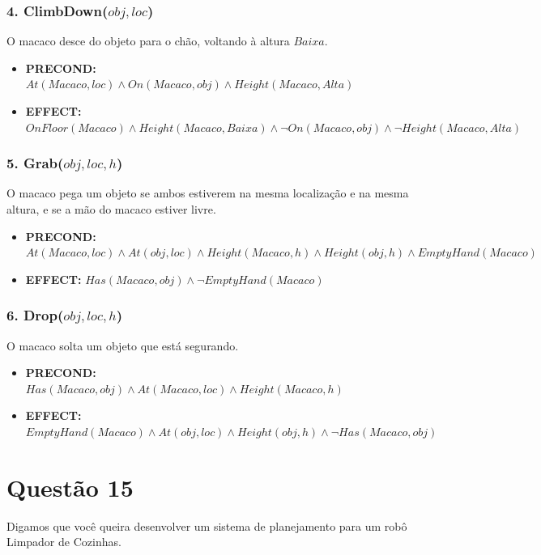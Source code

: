 \documentclass[a4paper,12pt]{article}
\begin{document}
\subsubsection*{4. ClimbDown($obj, loc$)}
O macaco desce do objeto para o chão, voltando à altura $Baixa$.
\begin{itemize}
	\item \textbf{PRECOND:} $At(Macaco, loc) \wedge On(Macaco, obj) \wedge Height(Macaco, Alta)$
	\item \textbf{EFFECT:} $OnFloor(Macaco) \wedge Height(Macaco, Baixa) \wedge \neg On(Macaco, obj) \wedge \neg Height(Macaco, Alta)$
\end{itemize}

\subsubsection*{5. Grab($obj, loc, h$)}
O macaco pega um objeto se ambos estiverem na mesma localização e na mesma altura, e se a mão do macaco estiver livre.
\begin{itemize}
	\item \textbf{PRECOND:} $At(Macaco, loc) \wedge At(obj, loc) \wedge Height(Macaco, h) \wedge Height(obj, h) \wedge EmptyHand(Macaco)$
	\item \textbf{EFFECT:} $Has(Macaco, obj) \wedge \neg EmptyHand(Macaco)$
\end{itemize}

\subsubsection*{6. Drop($obj, loc, h$)}
O macaco solta um objeto que está segurando.
\begin{itemize}
	\item \textbf{PRECOND:} $Has(Macaco, obj) \wedge At(Macaco, loc) \wedge Height(Macaco, h)$
	\item \textbf{EFFECT:} $EmptyHand(Macaco) \wedge At(obj, loc) \wedge Height(obj, h) \wedge \neg Has(Macaco, obj)$
\end{itemize}


\section*{Questão 15}


Digamos que você queira desenvolver um sistema de planejamento para um robô Limpador de Cozinhas.
\end{document}

